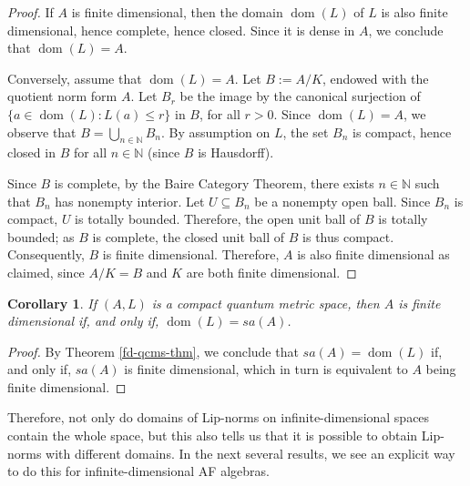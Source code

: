 \documentclass[]{amsart}
\newcommand{\ninn}{n \in \N}
\newcommand{\N}{{\mathds{N}}}
\newcommand{\dom}[1]{{\operatorname*{dom}\left({#1}\right)}}
\theoremstyle{plain}
\newtheorem{corollary}[theorem]{Corollary}
\theoremstyle{definition}
\theoremstyle{remark}
\renewcommand{\leq}{\leqslant}
\numberwithin{equation}{section}
\begin{document}
\begin{proof}
  If $A$ is finite dimensional, then the domain $\dom{L}$ of $L$ is also finite dimensional, hence complete, hence closed. Since it is dense in $A$, we conclude that $\dom{L}=A$.

  Conversely, assume that $\dom{L}=A$. Let $B :=A/K$, endowed with the quotient norm form $A$. Let $B_r$ be the image by the canonical surjection of $\{a \in \dom{L} : L(a)\leq r\}$ in $B$, for all $r > 0$. Since $\dom{L} = A$, we observe that $B = \bigcup_{n\in\N} B_n$. By assumption on $L$, the set $B_n$ is compact, hence closed in $B$ for all $\ninn$ (since $B$ is Hausdorff).

  Since $B$ is complete, by the Baire Category Theorem, there exists $\ninn$ such that $B_n$ has nonempty interior. Let $U\subseteq B_n$ be a nonempty open ball. Since $B_n$ is compact, $U$ is totally bounded. Therefore, the open unit ball of $B$ is totally bounded; as $B$ is complete, the closed unit ball of $B$ is thus compact. Consequently, $B$ is finite dimensional. Therefore, $A$ is also finite dimensional as claimed, since $A/K = B$ and $K$ are both finite dimensional.
\end{proof}




\begin{corollary}\label{c:dom}
  If $(A,L)$ is a compact quantum metric space, then $A$ is finite dimensional if, and only if, $\dom{L}=sa(A)$.
\end{corollary}

\begin{proof}
  By Theorem  \ref{fd-qcms-thm}, we conclude that $sa(A) = \dom{L}$ if, and only if, $sa(A)$ is finite dimensional, which in turn is equivalent to $A$ being finite dimensional.
\end{proof}



Therefore, not only do domains of Lip-norms on infinite-dimensional spaces contain the whole space, but  this also tells us that it is possible to obtain Lip-norms with different domains. In the next several results, we see an explicit way to do this for infinite-dimensional AF algebras.
\end{document}
